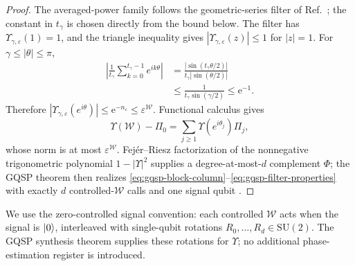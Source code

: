 \documentclass[10pt,conference]{IEEEtran}
\theoremstyle{plain}
\theoremstyle{remark}
\begin{document}
\begin{proof}
The averaged-power family follows the geometric-series filter of
Ref.~\cite{claudon2025simplealgorithmreflecteigenspaces}; the constant
in \(t_\gamma\) is chosen directly from the bound below.  The filter has
\(\Upsilon_{\gamma,\varepsilon}(1)=1\), and the triangle inequality
gives \(|\Upsilon_{\gamma,\varepsilon}(z)|\leq1\) for
\(|z|=1\).  For \(\gamma\leq|\theta|\leq\pi\),
\begin{align}
\left|
\frac{1}{t_\gamma}\sum_{k=0}^{t_\gamma-1}e^{ik\theta}
\right|
&=
\frac{|\sin(t_\gamma\theta/2)|}
{t_\gamma|\sin(\theta/2)|}\nonumber\\
&\leq
\frac{1}{t_\gamma\sin(\gamma/2)}
\leq \mathrm e^{-1}.
\label{eq:geometric-filter-bound}
\end{align}
Therefore
\(|\Upsilon_{\gamma,\varepsilon}(e^{i\theta})|
\leq\mathrm e^{-n_\varepsilon}
\leq\varepsilon^{\mathcal W}\).
Functional calculus gives
\[
\Upsilon(\mathcal W)-\Pi_0
=\sum_{j\geq1}\Upsilon(e^{i\theta_j})\Pi_j ,
\]
whose norm is at most \(\varepsilon^{\mathcal W}\).
Fej\'er--Riesz factorization of the nonnegative trigonometric
polynomial \(1-|\Upsilon|^2\) supplies a degree-at-most-\(d\)
complement \(\Phi\); the GQSP theorem then realizes
\eqref{eq:gqsp-block-column}--\eqref{eq:gqsp-filter-properties} with
exactly \(d\) controlled-\(\mathcal W\) calls and one signal qubit
\cite{MotlaghWiebe2024GQSP}.
\end{proof}

We use the zero-controlled signal convention: each controlled
\(\mathcal W\) acts when the signal is \(\ket0\), interleaved with
single-qubit rotations \(R_0,\ldots,R_d\in\mathrm{SU}(2)\).
The GQSP synthesis theorem supplies these rotations for
\(\Upsilon\); no additional phase-estimation register is introduced.
\end{document}
